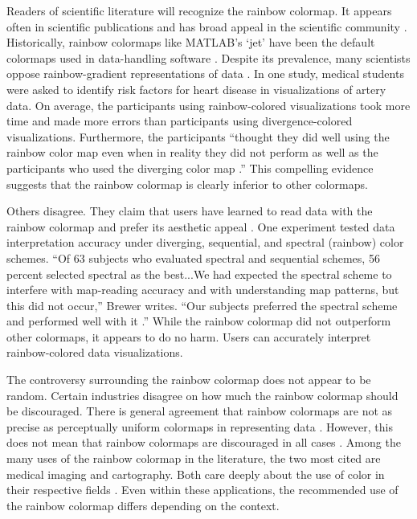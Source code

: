 \documentclass[journal,12pt]{IEEEtran}
\begin{document}
Readers of scientific literature will recognize the rainbow colormap. 
It appears often in scientific publications and has 
broad appeal in the scientific community
\cite{endofrainbow, rainbowstill, spectralschemes,choropleth}.
 Historically, rainbow colormaps like
MATLAB’s ‘jet’ have been the default colormaps used
in data-handling software \cite{matlab}. Despite its prevalence, 
many scientists oppose rainbow-gradient representations of data
\cite{rainbowstill, endofrainbow, viridis,arteryvis}.
 In one study, medical students were
asked to identify risk factors for heart disease in visualizations
of artery data. On average, the participants
using rainbow-colored visualizations took more time
and made more errors than participants using divergence-colored visualizations. 
Furthermore, the participants “thought they did well using the rainbow color
map even when in reality they did not perform as well
as the participants who used the diverging color map
\cite{arteryvis}.” This compelling evidence suggests
that the rainbow colormap is clearly inferior to other
colormaps.

Others disagree. They claim that users have learned to
read data with the rainbow colormap and prefer its
aesthetic appeal \cite{spectralschemes, choropleth}. One
experiment tested data interpretation accuracy under
diverging, sequential, and spectral (rainbow) color
schemes. “Of 63 subjects who evaluated spectral and
sequential schemes, 56 percent selected spectral as the
best...We had expected the spectral scheme to interfere
with map-reading accuracy and with understanding
map patterns, but this did not occur,” Brewer writes.
“Our subjects preferred the spectral scheme
and performed well with it \cite{spectralschemes}.”
 While the rainbow colormap did not outperform other colormaps, it
appears to do no harm. Users can accurately interpret
rainbow-colored data visualizations.

The controversy surrounding the rainbow colormap does not appear to be random.
Certain industries disagree on how much the rainbow colormap should be 
discouraged. There is general agreement that rainbow colormaps are not as 
precise as perceptually uniform colormaps in representing data 
\cite{colorvblackwhite}. However, this 
does not mean that rainbow colormaps are discouraged in all cases
 \cite{spectralschemes}. 
Among the many uses of the rainbow colormap in the
literature, the two most cited are
medical imaging and cartography. Both care deeply about the use of color in 
their respective fields \cite{colorguidelines, standardmedimg}. Even within
 these applications, the recommended use of the rainbow colormap differs
 depending on the context.
 
\end{document}
